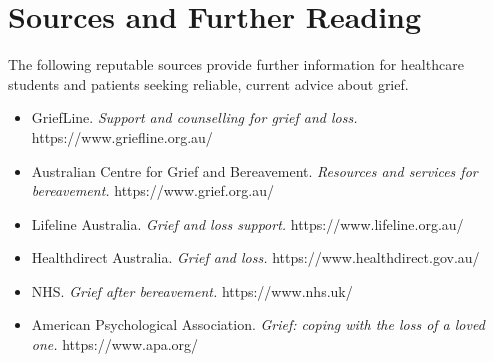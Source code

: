 \section*{Sources and Further Reading}
The following reputable sources provide further information for healthcare students and patients seeking reliable, current advice about grief.

\begin{itemize}
    \item GriefLine. \textit{Support and counselling for grief and loss.} https://www.griefline.org.au/
    \item Australian Centre for Grief and Bereavement. \textit{Resources and services for bereavement.} https://www.grief.org.au/
    \item Lifeline Australia. \textit{Grief and loss support.} https://www.lifeline.org.au/
    \item Healthdirect Australia. \textit{Grief and loss.} https://www.healthdirect.gov.au/
    \item NHS. \textit{Grief after bereavement.} https://www.nhs.uk/
    \item American Psychological Association. \textit{Grief: coping with the loss of a loved one.} https://www.apa.org/
\end{itemize}
